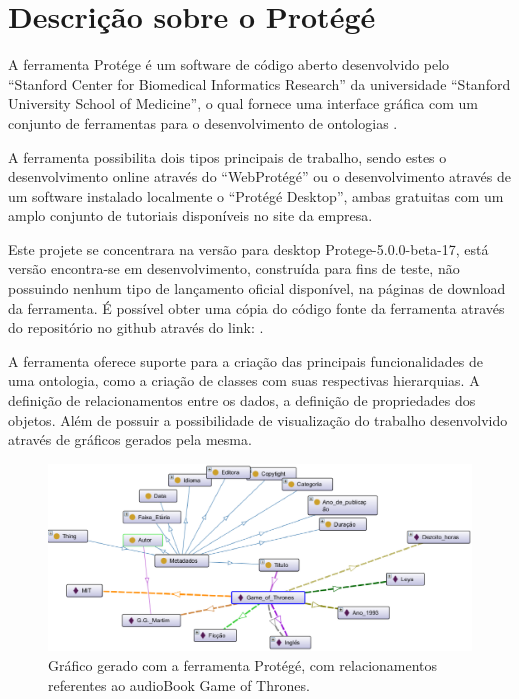 \chapter{Descrição sobre o Protégé}\label{cap4}

A ferramenta Protége é um software de código aberto desenvolvido pelo “Stanford Center for Biomedical Informatics Research” da universidade “Stanford University School of Medicine”, o qual fornece uma interface gráfica com um conjunto de ferramentas para o desenvolvimento de ontologias \cite{Protege}.

A ferramenta possibilita dois tipos principais de trabalho, sendo estes o desenvolvimento online através do “WebProtégé” ou o desenvolvimento através de um software instalado localmente o “Protégé Desktop”, ambas gratuitas com um amplo conjunto de tutoriais disponíveis no site da empresa.

Este projete se concentrara na versão para desktop Protege-5.0.0-beta-17, está versão encontra-se em desenvolvimento, construída para fins de teste, não possuindo nenhum tipo de lançamento oficial disponível, na páginas de download da ferramenta. É possível obter uma cópia do código fonte da ferramenta através do repositório no github através do link: \cite{GIT}.

A ferramenta oferece suporte para a criação das principais funcionalidades de uma ontologia, como a criação de classes com suas respectivas hierarquias. A definição de relacionamentos entre os dados, a definição de propriedades dos objetos. Além de possuir a possibilidade de visualização do trabalho desenvolvido através de gráficos gerados pela mesma.

 \begin{figure}[ht]
  \centering
    \includegraphics[keepaspectratio=true,scale=0.5]{figuras/protege.eps}
  \caption{Gráfico gerado com a ferramenta Protégé, com relacionamentos referentes ao audioBook Game of Thrones.}
  \label{fig:protege}
\end{figure}

